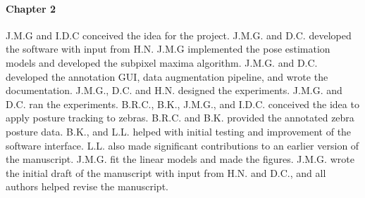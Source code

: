\documentclass[11pt,a4paper,oneside]{article}
\begin{document}
\paragraph{Chapter 2}
J.M.G and I.D.C conceived the idea for the project. J.M.G. and D.C. developed the software with input from H.N. J.M.G implemented the pose estimation models and developed the subpixel maxima algorithm. J.M.G. and D.C. developed the annotation GUI, data augmentation pipeline, and wrote the documentation. J.M.G., D.C. and H.N. designed the experiments. J.M.G. and D.C. ran the experiments. B.R.C., B.K., J.M.G., and I.D.C. conceived the idea to apply posture tracking to zebras. B.R.C. and B.K. provided the annotated zebra posture data. B.K., and L.L. helped with initial testing and improvement of the software interface. L.L. also made significant contributions to an earlier version of the manuscript. J.M.G. fit the linear models and made the figures. J.M.G. wrote the initial draft of the manuscript with input from H.N. and D.C., and all authors helped revise the manuscript.
\end{document}
